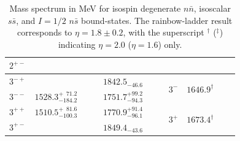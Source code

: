\begin{table}[!th]
\begin{tabular}{c|ccc|ccc||c|ccc}
$2^{+-}$                    &                                      &                                    &                &                           &                           &                   &         &     & & \\
\hline                                                                                                                                                                                                     
$3^{-+}$                    &                                      &                                    &                &  $1842.5_{-46.6}$         &                           &                   &  \multirow{2}{*}{$3^-$}       & \multirow{2}{*}{ $1646.9^\dag$ }  &  \multirow{2}{*}{} & \multirow{2}{*}{} \\
$3^{--}$                    & $1528.3^{+\phantom{1}71.2}_{-184.2}$ &                                    &                &  $1751.7^{+99.2}_{-94.3}$ &                           &                   &         &     & & \\
$3^{++}$                    & $1510.5^{+\phantom{1}81.6}_{-100.3}$ &                                    &                &  $1770.9^{+91.4}_{-96.1}$ &                           &                   &  \multirow{2}{*}{$3^+$}       & \multirow{2}{*}{ $1673.4^\dag$  } &  \multirow{2}{*}{} & \multirow{2}{*}{} \\
$3^{+-}$                    &  									&                                    &                &  $1849.4_{-43.6}$  &                           &                   &         &     & & \\                                                                                                                                                                      
\hline
\hline
\end{tabular}
\caption{Mass spectrum in MeV for isospin degenerate $n\bar{n}$, isoscalar $s\bar{s}$, and $I=1/2$ $n\bar{s}$ bound-states. The rainbow-ladder result corresponds to $\eta=1.8\pm0.2$, with the 
superscript ${}^\dag$ (${}^\ddag$) indicating $\eta=2.0$ ($\eta=1.6$) only.}\label{tab:results}
\end{table}


%
%
%
%
%

